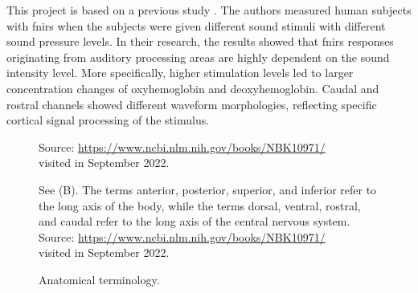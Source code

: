 This project is based on a previous study \citep{Weder2018}. The authors measured human subjects with  \acrshort{fnirs} when the subjects were given different sound stimuli with different sound pressure levels. In their research, the results showed that  \acrshort{fnirs} responses originating from auditory processing areas are highly dependent on the sound intensity level. More specifically, higher stimulation levels led to larger concentration changes of oxyhemoglobin and deoxyhemoglobin. Caudal and rostral channels showed different waveform morphologies, reflecting specific cortical signal processing of the stimulus. 

\begin{figure}[h]
  \centering
           {Source: \url{https://www.ncbi.nlm.nih.gov/books/NBK10971/} \\ visited in September 2022.}
   
  \caption{Anatomical terminology.}
  
  \medskip
  \footnotesize {See (B). The terms anterior, posterior, superior, and inferior refer to the long axis of the body, while the terms dorsal, ventral, rostral, and caudal refer to the long axis of the central nervous system. Source: \url{https://www.ncbi.nlm.nih.gov/books/NBK10971/}\\ visited in September 2022.}
\end{figure}



